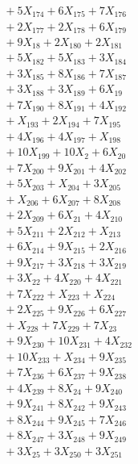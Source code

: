 \documentclass[a4paper,10pt]{article}
\begin{document}
{\begin{align}
&\quad  + 5X_{174} + 6X_{175} + 7X_{176} \\[0.5ex]
&\quad  + 2X_{177} + 2X_{178} + 6X_{179} \\[0.5ex]
&\quad  + 9X_{18} + 2X_{180} + 2X_{181} \\[0.5ex]
&\quad  + 5X_{182} + 5X_{183} + 3X_{184} \\[0.5ex]
&\quad  + 3X_{185} + 8X_{186} + 7X_{187} \\[0.5ex]
&\quad  + 3X_{188} + 3X_{189} + 6X_{19} \\[0.5ex]
&\quad  + 7X_{190} + 8X_{191} + 4X_{192} \\[0.5ex]
&\quad  + X_{193} + 2X_{194} + 7X_{195} \\[0.5ex]
&\quad  + 4X_{196} + 4X_{197} + X_{198} \\[0.5ex]
&\quad  + 10X_{199} + 10X_{2} + 6X_{20} \\[0.5ex]
&\quad  + 7X_{200} + 9X_{201} + 4X_{202} \\[0.5ex]
&\quad  + 5X_{203} + X_{204} + 3X_{205} \\[0.5ex]
&\quad  + X_{206} + 6X_{207} + 8X_{208} \\[0.5ex]
&\quad  + 2X_{209} + 6X_{21} + 4X_{210} \\[0.5ex]
&\quad  + 5X_{211} + 2X_{212} + X_{213} \\[0.5ex]
&\quad  + 6X_{214} + 9X_{215} + 2X_{216} \\[0.5ex]
&\quad  + 9X_{217} + 3X_{218} + 3X_{219} \\[0.5ex]
&\quad  + 3X_{22} + 4X_{220} + 4X_{221} \\[0.5ex]
&\quad  + 7X_{222} + X_{223} + X_{224} \\[0.5ex]
&\quad  + 2X_{225} + 9X_{226} + 6X_{227} \\[0.5ex]
&\quad  + X_{228} + 7X_{229} + 7X_{23} \\[0.5ex]
&\quad  + 9X_{230} + 10X_{231} + 4X_{232} \\[0.5ex]
&\quad  + 10X_{233} + X_{234} + 9X_{235} \\[0.5ex]
&\quad  + 7X_{236} + 6X_{237} + 9X_{238} \\[0.5ex]
&\quad  + 4X_{239} + 8X_{24} + 9X_{240} \\[0.5ex]
&\quad  + 9X_{241} + 8X_{242} + 9X_{243} \\[0.5ex]
&\quad  + 8X_{244} + 9X_{245} + 7X_{246} \\[0.5ex]
&\quad  + 8X_{247} + 3X_{248} + 9X_{249} \\[0.5ex]
&\quad  + 3X_{25} + 3X_{250} + 3X_{251} \\[0.5ex]

\end{align}}
\end{document}
